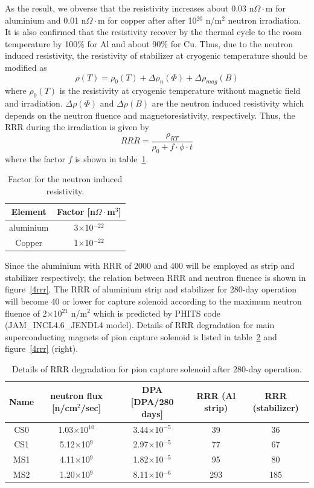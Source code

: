 As the result, we obverse that the resistivity increases about 0.03 n$\Omega\cdot$m for aluminium and 0.01 n$\Omega\cdot$m for copper after after 10$^{20}$ n/m$^2$ neutron irradiation.
It is also confirmed that the resistivity recover by the thermal cycle to the room temperature by 100\% for Al and about 90\% for Cu.
Thus, due to the neutron induced resistivity, the resistivity of stabilizer at cryogenic temperature should be modified as
\begin{equation}
 \rho (T) = \rho_0(T) + \Delta \rho_{n} (\Phi) + \Delta \rho_{mag} (B)
\end{equation}
where $\rho_0(T)$ is the resistivity at cryogenic temperature without magnetic field and irradiation.
$\Delta \rho(\Phi)$ and $\Delta \rho(B)$ are the neutron induced resistivity which depends on the neutron fluence and magnetoresistivity, respectively.
Thus, the RRR during the irradiation is given by
\begin{equation}
 RRR = \frac{\rho_{RT}}{\rho_0 + f \cdot \phi \cdot t}
\end{equation}
where the factor $f$ is shown in table~\ref{factorirr}.
\begin{table}[H]
 \centering
 \begin{tabular}{cc} \hline \hline
  Element & Factor [n$\Omega\cdot$m$^3$] \\ \hline
  aluminium & 3$\times$10$^{-22}$ \\
  Copper & 1$\times$10$^{-22}$ \\ \hline \hline
 \end{tabular}
 \caption{Factor for the neutron induced resistivity.}
 \label{factorirr}
\end{table}
Since the aluminium with RRR of 2000 and 400 will be employed as strip and stabilizer respectively, the relation between RRR and neutron fluence is shown in figure~\ref{4rrr}.
The RRR of aluminium strip and stabilizer for 280-day operation will become 40 or lower for capture solenoid according to the maximum neutron fluence of 2$\times$10$^{21}$ n/m$^2$ which is predicted by PHITS code (JAM\_INCL4.6\_JENDL4 model).
Details of RRR degradation for main superconducting magnets of pion capture solenoid is listed in table~\ref{RRRdeg} and figure~\ref{4rrr} (right).
\begin{table}[H]
 \centering
 \begin{tabular}{ccccc} \hline \hline
  Name & neutron flux [n/cm$^2$/sec] & DPA [DPA/280 days] & RRR (Al strip) & RRR (stabilizer) \\ \hline
  CS0 & 1.03$\times$10$^{10}$ & 3.44$\times$10$^{-5}$ & 39 & 36 \\
  CS1 & 5.12$\times$10$^{9}$ & 2.97$\times$10$^{-5}$ & 77 & 67 \\
  MS1 & 4.11$\times$10$^{9}$ & 1.82$\times$10$^{-5}$ & 95 & 80 \\
  MS2 & 1.20$\times$10$^{9}$ & 8.11$\times$10$^{-6}$ & 293 & 185 \\ \hline \hline
 \end{tabular}
 \caption{Details of RRR degradation for pion capture solenoid after 280-day operation.}
 \label{RRRdeg}
\end{table}
